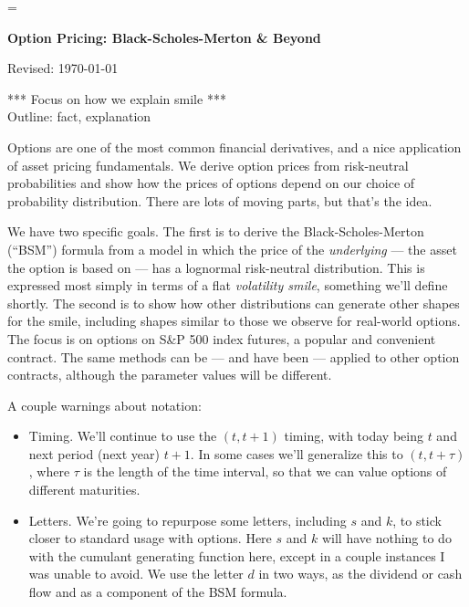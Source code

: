 \documentclass[11pt]{article}
\begin{document}
\parskip=\bigskipamount
\parindent=0.0in
\thispagestyle{empty}


\bigskip\bigskip
\centerline{\Large \bf Option Pricing: Black-Scholes-Merton \& Beyond}
\centerline{Revised: \today}

\begin{comment}
* Figure out graphs v underlying future value and v strike k
\end{comment}

*** Focus on how we explain smile *** \\
Outline:  fact, explanation 

\bigskip
Options are one of the most common financial derivatives, and
a nice application of asset pricing fundamentals.
We derive option prices from risk-neutral probabilities
and show how the prices of options depend on our choice of probability distribution.
There are lots of moving parts, but that's the idea.


We have two specific goals.
The first is to derive the Black-Scholes-Merton (``BSM'') formula from a model
in which the price of the {\it underlying\/} ---
the asset the option is based on ---
has a lognormal risk-neutral distribution.
This is expressed most simply in terms of a flat {\it volatility smile\/},
something we'll define shortly.
The second is to show how other distributions can generate other
shapes for the smile, including shapes similar to those
we observe for real-world options.
The focus is on options on S\&P 500 index futures,
a popular and convenient contract.
The same methods can be --- and have been ---
applied to other option contracts,
although the parameter values will be different.

A couple warnings about notation:
\begin{itemize}
\item Timing.
We'll continue to use the $(t, t+1)$ timing,
with today being $t$ and next period (next year) $t+1$.
In some cases we'll generalize this to $(t,t+\tau)$,
where $\tau$ is the length of the time interval,
so that we can value options of different maturities.

\item Letters.
We're going to repurpose some letters, including $s$ and $k$,
to stick closer to standard usage with options.
Here $s$ and $k$ will have nothing to do with the cumulant generating function here,
except in a couple instances I was unable to avoid.
We use the letter $d$ in two ways,
as the dividend or cash flow and as a component of the BSM formula.
\end{itemize}
\end{document}
